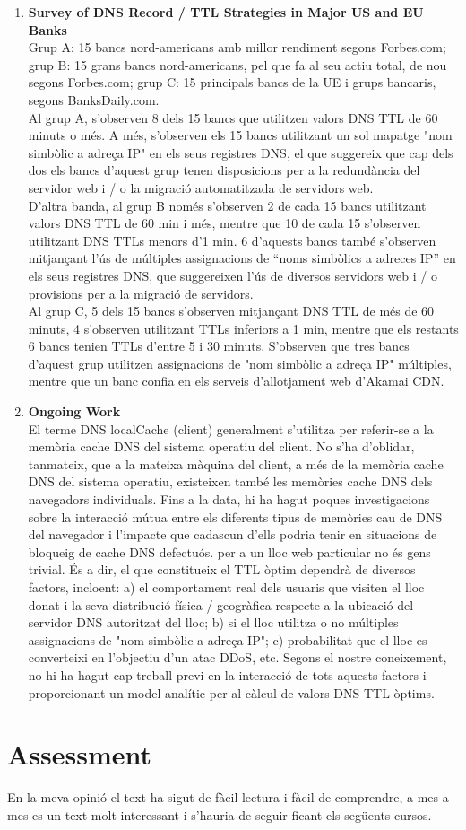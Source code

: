 \documentclass[a4paper, 10pt]{article}
\begin{document}
\begin{enumerate}
\item \textbf{Survey of DNS Record / TTL Strategies in Major US and EU Banks} \\
 Grup A: 15 bancs nord-americans amb millor rendiment segons Forbes.com; grup B: 15 grans bancs nord-americans, pel que fa al seu actiu total, de nou segons Forbes.com; grup C: 15 principals bancs de la UE i grups bancaris, segons BanksDaily.com.\\
 Al grup A, s'observen 8 dels 15 bancs que utilitzen valors DNS TTL de 60 minuts o més. A més, s'observen els 15 bancs utilitzant un sol mapatge "nom simbòlic a adreça IP" en els seus registres DNS, el que suggereix que cap dels dos els bancs d’aquest grup tenen disposicions per a la redundància del servidor web i / o la migració automatitzada de servidors web.\\
D'altra banda, al grup B només s’observen 2 de cada 15 bancs utilitzant valors DNS TTL de 60 min i més, mentre que 10 de cada 15 s’observen utilitzant DNS TTLs menors d’1 min. 6 d’aquests bancs també s’observen mitjançant l’ús de múltiples assignacions de “noms simbòlics a adreces IP” en els seus registres DNS, que suggereixen l’ús de diversos servidors web i / o provisions per a la migració de servidors.\\
Al grup C, 5 dels 15 bancs s'observen mitjançant DNS TTL de més de 60 minuts, 4 s'observen utilitzant TTLs inferiors a 1 min, mentre que els restants 6 bancs tenien TTLs d'entre 5 i 30 minuts. S’observen que tres bancs d’aquest grup utilitzen assignacions de "nom simbòlic a adreça IP" múltiples, mentre que un banc confia en els serveis d’allotjament web d’Akamai CDN.\\

\item \textbf{Ongoing Work} \\
El terme DNS localCache (client) generalment s'utilitza per referir-se a la memòria cache DNS del sistema operatiu del client. No s'ha d’oblidar, tanmateix, que a la mateixa màquina del client, a més de la memòria cache DNS del sistema operatiu, existeixen també les memòries cache DNS dels navegadors individuals. Fins a la data, hi ha hagut poques investigacions sobre la interacció mútua entre els diferents tipus de memòries cau de DNS del navegador i l’impacte que cadascun d’ells podria tenir en situacions de bloqueig de cache DNS defectuós. per a un lloc web particular no és gens trivial. És a dir, el que constitueix el TTL òptim dependrà de diversos factors, incloent: a) el comportament real dels usuaris que visiten el lloc donat i la seva distribució física / geogràfica respecte a la ubicació del servidor DNS autoritzat del lloc; b) si el lloc utilitza o no múltiples assignacions de "nom simbòlic a adreça IP"; c) probabilitat que el lloc es converteixi en l'objectiu d'un atac DDoS, etc. Segons el nostre coneixement, no hi ha hagut cap treball previ en la interacció de tots aquests factors i proporcionant un model analític per al càlcul de valors DNS TTL òptims.\\

\end{enumerate}

\section{Assessment}

En la meva opinió el text ha sigut de fàcil lectura i fàcil de comprendre, a mes a mes es un text molt interessant i s'hauria de seguir ficant els següents cursos.
\end{document}
